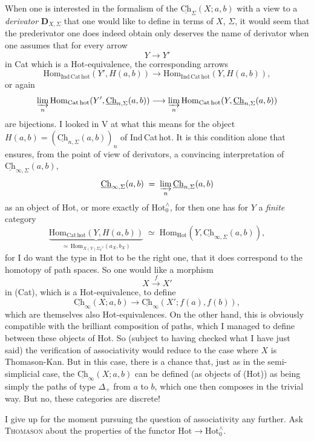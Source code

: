 \documentclass[11pt]{article}
\newcommand{\printedpage}[1]{\marginpar{\footnotesize p.~#1}}
\newcommand{\msp}[1]{\marginpar{\footnotesize [#1]}}
\newcommand{\Ch}{\underline{\mathrm{Ch}}}
\newcommand{\Hot}{\mathrm{Hot}}
\begin{document}
When one is interested in the formalism of the $\Ch_\Sigma(X;a,b)$ with a view to a \textit{derivator} $\mathbf{D}_{X,\Sigma}$ that one would like to define in terms of $X$, $\Sigma$, it would seem that the prederivator one does indeed obtain only deserves the name of derivator when one assumes that for every arrow
\[ Y\longrightarrow Y' \]
in Cat which is a Hot-equivalence, the corresponding arrows
\[ \mathrm{Hom}_{\mathrm{Ind\,Cat\,hot}}(Y',H(a,b)) \longrightarrow \mathrm{Hom}_{\mathrm{Ind\,Cat\,hot}}(Y,H(a,b)), \]
or again
\[ \varinjlim_n \mathrm{Hom}_{\mathrm{Cat\,hot}}(Y',\Ch_{n,\Sigma}(a,b)) \longrightarrow \varinjlim_n \mathrm{Hom}_{\mathrm{Cat\,hot}}(Y,\Ch_{n,\Sigma}(a,b)) \]
are bijections. I looked in V at what this means for the object $H(a,b) = (\Ch_{n,\Sigma}(a,b))_n$ of Ind\,Cat\,hot. It is this condition alone that ensures, from the point of view of derivators, a convincing interpretation of $\Ch_{\infty,\Sigma}(a,b)$,
\[ \Ch_{\infty,\Sigma}(a,b) \;=\; \varinjlim_n \Ch_{n,\Sigma}(a,b) \]
as an object of Hot, or more exactly of $\Hot^{\wedge}_{0}$, for then one has for $Y$ a \textit{finite} category
\[ \underbrace{\mathrm{Hom}_{\mathrm{Cat\,hot}}(Y,H(a,b))}_{\simeq\,\mathrm{Hom}_{X(Y)\Sigma_Y^{-1}}(a_X,b_X)} \;\simeq\; \mathrm{Hom}_{\Hot}(Y,\Ch_{\infty,\Sigma}(a,b)), \]
\msp{page 130}
for I do want the type in Hot to be the right one, that it does correspond to the homotopy of path spaces. So one would like a morphism
\[ X\xrightarrow{\;f\;}X' \]
in (Cat), which is a Hot-equivalence, to define
\[ \Ch_\infty(X;a,b) \longrightarrow \Ch_\infty(X';f(a),f(b)), \]
which are themselves also Hot-equivalences. On the other hand, this is obviously compatible with the brilliant composition of paths, which I managed to define between these objects of Hot. So (subject to having checked what I have just said) the verification of associativity would reduce to the case where $X$ is Thomason-Kan. But in this case, there is a chance that, just as in the semi-simplicial case, the $\Ch_\infty(X;a,b)$ can be defined (as objects of (Hot)) as being simply the paths of type $\Delta_+$ from $a$ to $b$, which one then composes in the trivial way. But no, these categories are discrete! %

I give up for the moment pursuing the question of associativity any further. Ask \textsc{Thomason} about the properties of the functor $\Hot\longrightarrow\Hot^{\wedge}_{0}$.

\clearpage
\printedpage{82}
\end{document}
